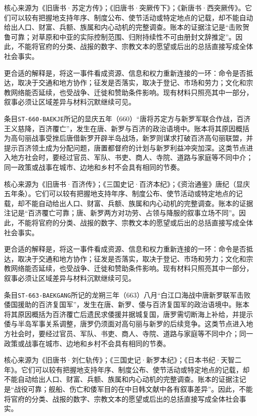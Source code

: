 核心来源为《旧唐书·苏定方传》；《旧唐书·突厥传下》；《新唐书·西突厥传》。它们可以较有把握地支持年序、制度公布、使节活动或特定地点的记载，却不能自动给出人口、财富、兵额、族属和内心动机的完整调查。账本的证据注记是“击败贺鲁可靠；对草原和中亚的实际控制范围、归附持续性不可由册封文辞推定”。因此，不能将官府的分类、战报的数字、宗教文本的愿望或后出的总括直接写成全体社会事实。

更合适的解释是，将这一事件看成资源、信息和权力重新连接的一环：命令是否抵达，取决于交通和地方协作；征发是否落实，取决于登记、市场和劳力；文化和宗教网络能否延续，也受战争、迁徙和赞助条件影响。现有材料只照亮其中一部分，叙事必须让区域差异与材料沉默继续可见。

条目\texttt{ST-660-BAEKJE}所记的显庆五年（660）“唐将苏定方与新罗军联合作战，百济王义慈降，百济覆亡”，发生在唐、新罗与百济的政治语境中。账本将其原因概括为高句丽战事受挫后唐借新罗开辟半岛战场，新罗则谋求打破百济高句丽联盟，并提示百济领土成为分配问题，唐置都督府的计划与新罗利益冲突加深。这类节点进入地方社会时，要经过官员、军队、书吏、商人、寺院、道路与家庭等不同中介；同一政策或战事在城市、边地和乡村不会具有相同的节奏。

核心来源为《旧唐书·百济传》；《三国史记·百济本纪》；《资治通鉴》唐纪（显庆五年条）。它们可以较有把握地支持年序、制度公布、使节活动或特定地点的记载，却不能自动给出人口、财富、兵额、族属和内心动机的完整调查。账本的证据注记是“百济覆亡可靠；唐、新罗两方对功劳、占领与降服的叙事立场不同”。因此，不能将官府的分类、战报的数字、宗教文本的愿望或后出的总括直接写成全体社会事实。

更合适的解释是，将这一事件看成资源、信息和权力重新连接的一环：命令是否抵达，取决于交通和地方协作；征发是否落实，取决于登记、市场和劳力；文化和宗教网络能否延续，也受战争、迁徙和赞助条件影响。现有材料只照亮其中一部分，叙事必须让区域差异与材料沉默继续可见。

条目\texttt{ST-663-BAEKGANG}所记的龙朔三年（663）八月“白江口海战中唐新罗联军击败倭国援助的百济复国军”，发生在唐、新罗、倭与百济复国军的政治语境中。账本将其原因概括为百济覆亡后遗民求倭援并据城复国，唐罗需切断海上补给，并提示倭与半岛军事关系调整，唐罗仍须面对高句丽与新罗的后续竞争。这类节点进入地方社会时，要经过官员、军队、书吏、商人、寺院、道路与家庭等不同中介；同一政策或战事在城市、边地和乡村不会具有相同的节奏。

核心来源为《旧唐书·刘仁轨传》；《三国史记·新罗本纪》；《日本书纪·天智二年》。它们可以较有把握地支持年序、制度公布、使节活动或特定地点的记载，却不能自动给出人口、财富、兵额、族属和内心动机的完整调查。账本的证据注记是“战役可靠；舰船、伤亡和倭军目的在中日韩文献中各有叙事差异”。因此，不能将官府的分类、战报的数字、宗教文本的愿望或后出的总括直接写成全体社会事实。

